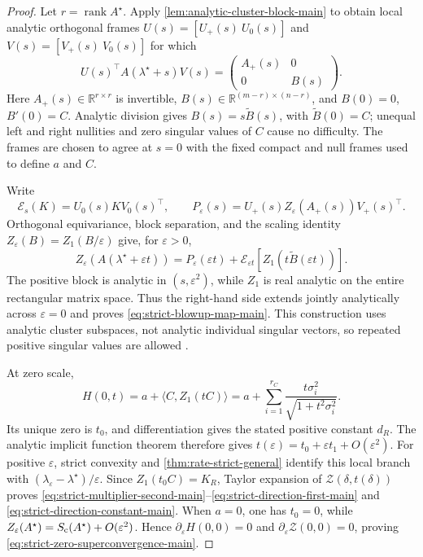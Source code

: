 \begin{proof}
Let \(r=\operatorname{rank}A^\star\).  Apply
\cref{lem:analytic-cluster-block-main} to obtain local analytic orthogonal frames
\(U(s)=[U_+(s)\ U_0(s)]\) and \(V(s)=[V_+(s)\ V_0(s)]\) for which
\[
 U(s)^\top A(\lambda^\star+s)V(s)
 =\begin{pmatrix}A_+(s)&0\\0&B(s)\end{pmatrix}.
\]
Here \(A_+(s)\in\mathbb R^{r\times r}\) is invertible,
\(B(s)\in\mathbb R^{(m-r)\times(n-r)}\), and
\(B(0)=0\), \(B'(0)=C\).  Analytic division gives
\(B(s)=s\widetilde B(s)\), with \(\widetilde B(0)=C\); unequal left and
right nullities and zero singular values of \(C\) cause no difficulty.
The frames are chosen to agree at \(s=0\) with the fixed compact and null
frames used to define \(a\) and \(C\).

Write
\[
 \mathcal E_s(K)=U_0(s)KV_0(s)^\top,
 \qquad
 P_\varepsilon(s)=
 U_+(s)Z_\varepsilon(A_+(s))V_+(s)^\top.
\]
Orthogonal equivariance, block separation, and the scaling identity
\(Z_\varepsilon(B)=Z_1(B/\varepsilon)\) give, for \(\varepsilon>0\),
\begin{equation}
 Z_\varepsilon(A(\lambda^\star+\varepsilon t))
 =P_\varepsilon(\varepsilon t)
 +\mathcal E_{\varepsilon t}
  \left[Z_1\!\left(t\widetilde B(\varepsilon t)\right)\right].
 \label{eq:strict-blowup-block-main}
\end{equation}
The positive block is analytic in \((s,\varepsilon^2)\), while \(Z_1\) is
real analytic on the entire rectangular matrix space.  Thus the right-hand
side extends jointly analytically across \(\varepsilon=0\) and proves
\eqref{eq:strict-blowup-map-main}.  This construction uses analytic cluster
subspaces, not analytic individual singular vectors, so repeated positive
singular values are allowed \citep[Chapter II]{kato1995perturbation}.

At zero scale,
\[
 H(0,t)=a+\langle C,Z_1(tC)\rangle
 =a+\sum_{i=1}^{r_C}
   \frac{t\sigma_i^2}{\sqrt{1+t^2\sigma_i^2}}.
\]
Its unique zero is \(t_0\), and differentiation gives the stated positive
constant \(d_R\).  The analytic implicit function theorem therefore gives
\(t(\varepsilon)=t_0+\varepsilon t_1+O(\varepsilon^2)\).  For positive
\(\varepsilon\), strict convexity and
\cref{thm:rate-strict-general} identify this local branch with
\((\lambda_\varepsilon-\lambda^\star)/\varepsilon\).
Since \(Z_1(t_0C)=K_R\), Taylor expansion of
\(\mathcal Z(\delta,t(\delta))\) proves
\eqref{eq:strict-multiplier-second-main}--\eqref{eq:strict-direction-first-main}
and \eqref{eq:strict-direction-constant-main}.  When \(a=0\), one has
\(t_0=0\), while
\(Z_\varepsilon(A^\star)=S_{\mathrm c}(A^\star)+O(\varepsilon^2)\).  Hence
\(\partial_\varepsilon H(0,0)=0\) and
\(\partial_\varepsilon\mathcal Z(0,0)=0\), proving
\eqref{eq:strict-zero-superconvergence-main}.
\end{proof}

